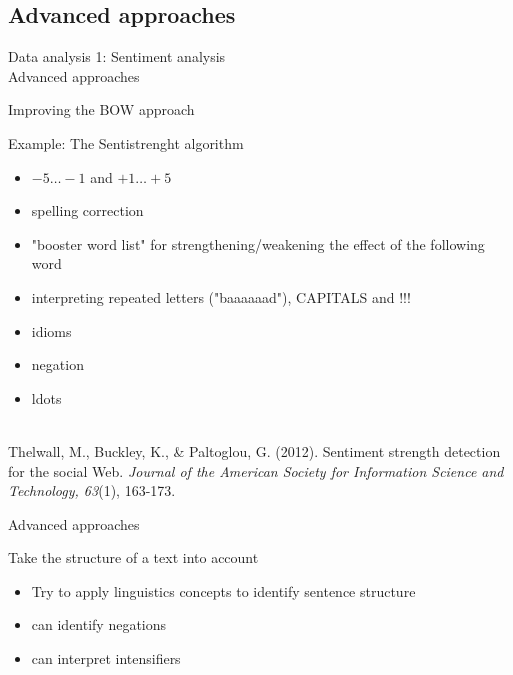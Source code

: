 \documentclass{beamer}
\begin{document}
\subsection{Advanced approaches}
\begin{frame}
Data analysis 1: Sentiment analysis\\
Advanced approaches
\end{frame}


\begin{frame}{Improving the BOW approach}
\begin{block}{Example: The Sentistrenght algorithm}
\begin{itemize}
\item $-5\ldots-1$ and $+1\ldots+5$
\item spelling correction
\item "booster word list" for strengthening/weakening the effect of the following word
\item interpreting repeated letters ("baaaaaad"), CAPITALS and !!!
\item idioms
\item negation 
\item ldots
\end{itemize}
\end{block}
~ \\
\tiny{Thelwall, M., Buckley, K., \& Paltoglou, G. (2012). Sentiment strength detection for the social Web. \emph{Journal of the American Society for Information Science and Technology, 63}(1), 163-173.\\}
\end{frame}


\begin{frame}{Advanced approaches}
\begin{block}{Take the structure of a text into account}
\begin{itemize}
\item Try to apply linguistics concepts to identify sentence structure
\item can identify negations
\item can interpret intensifiers
\end{itemize}
\end{block}
\end{frame}
\end{document}
